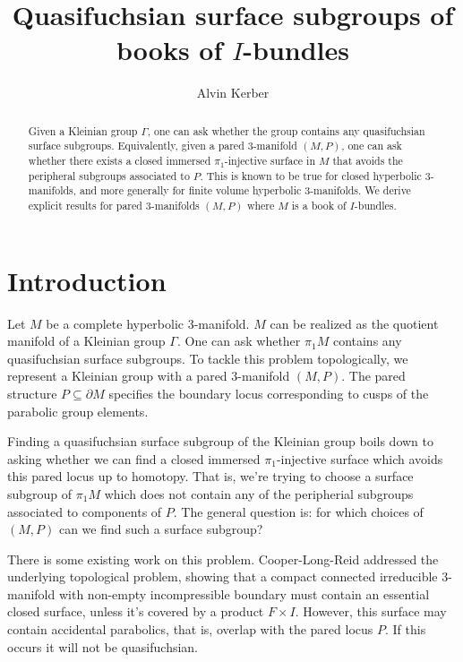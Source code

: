 \documentclass[12pt]{amsart}
\theoremstyle{definition}
\theoremstyle{remark}
\newcommand{\bd}{\partial}
\newcommand{\cin}{\subseteq}
\begin{document}
\title{Quasifuchsian surface subgroups of books of $I$-bundles}

\author{Alvin Kerber}

\begin{abstract}

Given a Kleinian group $\Gamma$, one can ask whether the group contains any
quasifuchsian surface subgroups. Equivalently, given a pared 3-manifold
$(M,P)$, one can ask whether there exists a closed immersed $\pi_1$-injective
surface in $M$ that avoids the peripheral subgroups associated to $P$.  This is
known to be true for closed hyperbolic 3-manifolds, and more generally for
finite volume hyperbolic 3-manifolds. We derive explicit results for pared
3-manifolds $(M,P)$ where $M$ is a book of $I$-bundles.

\end{abstract}

\maketitle
\section{Introduction}

Let $M$ be a complete hyperbolic 3-manifold. $M$ can be realized as the
quotient manifold of a Kleinian group $\Gamma$. One can ask whether $\pi_1M$
contains any quasifuchsian surface subgroups. To tackle this problem
topologically, we represent a Kleinian group with a pared 3-manifold $(M,P)$.
The pared structure $P\cin\bd M$ specifies the boundary locus corresponding to
cusps of the parabolic group elements.

Finding a quasifuchsian surface subgroup of the Kleinian group boils down to
asking whether we can find a closed immersed $\pi_1$-injective surface which
avoids this pared locus up to homotopy. That is, we're trying to choose
a surface subgroup of $\pi_1M$ which does not contain any of the peripherial
subgroups associated to components of $P$. The general question is: for which
choices of $(M,P)$ can we find such a surface subgroup?

There is some existing work on this problem. Cooper-Long-Reid \cite{CLR}
addressed the underlying topological problem, showing that a compact connected
irreducible 3-manifold with non-empty incompressible boundary  must contain an
essential closed surface, unless it's covered by a product $F\times I$.
However, this surface may contain accidental parabolics, that is, overlap with
the pared locus $P$. If this occurs it will not be quasifuchsian.
\end{document}
